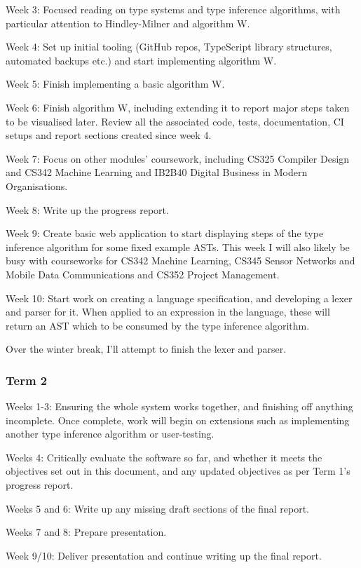 \documentclass[12pt]{article}
\begin{document}
Week 3: Focused reading on type systems and type inference algorithms, with particular attention to Hindley-Milner and algorithm W.

Week 4: Set up initial tooling (GitHub repos, TypeScript library structures, automated backups etc.) and start implementing algorithm W.

Week 5: Finish implementing a basic algorithm W.

Week 6: Finish algorithm W, including extending it to report major steps taken to be visualised later. Review all the associated code, tests, documentation, CI setups and report sections created since week 4.

Week 7: Focus on other modules’ coursework, including CS325 Compiler Design and CS342 Machine Learning and IB2B40 Digital Business in Modern Organisations.

Week 8: Write up the progress report.

Week 9: Create basic web application to start displaying steps of the type inference algorithm for some fixed example ASTs. This week I will also likely be busy with courseworks for CS342 Machine Learning, CS345 Sensor Networks and Mobile Data Communications and CS352 Project Management.

Week 10: Start work on creating a language specification, and developing a lexer and parser for it. When applied to an expression in the language, these will return an AST which to be consumed by the type inference algorithm.

Over the winter break, I’ll attempt to finish the lexer and parser.

\subsubsection{Term 2}

Weeks 1-3: Ensuring the whole system works together, and finishing off anything incomplete. Once complete, work will begin on extensions such as implementing another type inference algorithm or user-testing.

Weeks 4: Critically evaluate the software so far, and whether it meets the objectives set out in this document, and any updated objectives as per Term 1’s progress report.

Weeks 5 and 6: Write up any missing draft sections of the final report.

Weeks 7 and 8: Prepare presentation.

Week 9/10: Deliver presentation and continue writing up the final report.
\end{document}
